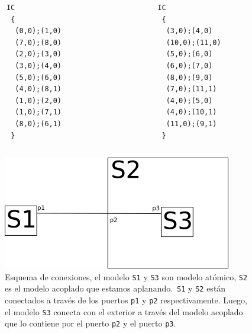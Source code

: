 \documentclass{beamer}
\begin{document}
\begin{frame}[fragile]
\begin{columns}[T] %
\begin{column}{.48\textwidth}
\begin{verbatim}
      IC
       {
        (0,0);(1,0)
        (7,0);(8,0)
        (2,0);(3,0)
        (3,0);(4,0)
        (5,0);(6,0)
        (4,0);(8,1)
        (1,0);(2,0)
        (1,0);(7,1)
        (8,0);(6,1)
       }
\end{verbatim}
\end{column}%
\hfill%
\begin{column}{.48\textwidth}
\begin{verbatim}
      IC
       {
        (3,0);(4,0)
        (10,0);(11,0)
        (5,0);(6,0)
        (6,0);(7,0)
        (8,0);(9,0)
        (7,0);(11,1)
        (4,0);(5,0)
        (4,0);(10,1)
        (11,0);(9,1)
       }
\end{verbatim}
\end{column}%
\end{columns}
\end{frame}

\begin{frame}
\begin{figure}[H]
\centering
\includegraphics[width=.75\textwidth]{text3418}
\caption{Esquema de conexiones, el modelo \texttt{S1} y \texttt{S3} son modelo atómico, \texttt{S2} es el modelo acoplado que estamos aplanando.\
	\texttt{S1} y \texttt{S2} están conectados a través de los puertos \texttt{p1} y \texttt{p2} respectivamente. Luego, el modelo \texttt{S3} conecta con
	el exterior a través del modelo acoplado que lo contiene por el puerto \texttt{p2} y el puerto  \texttt{p3}.
	} \label{fig:aplanado-ports}
\end{figure}
\end{frame}
\end{document}
